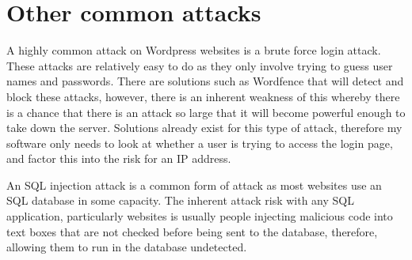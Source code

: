 
\section{Other common attacks} \label{attack3}
A highly common attack on Wordpress websites is a brute force login attack. These attacks are relatively easy to do as they only involve trying to guess user names and passwords. There are solutions such as Wordfence that will detect and block these attacks, however, there is an inherent weakness of this whereby there is a chance that there is an attack so large that it will become powerful enough to take down the server. Solutions already exist for this type of attack, therefore my software only needs to look at whether a user is trying to access the login page, and factor this into the risk for an IP address.

An SQL injection attack is a common form of attack as most websites use an SQL database in some capacity. The inherent attack risk with any SQL application, particularly websites is usually people injecting malicious code into text boxes that are not checked before being sent to the database, therefore, allowing them to run in the database undetected.